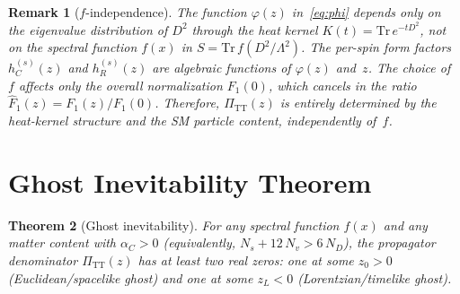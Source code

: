 \documentclass[11pt,a4paper]{article}
\newcommand{\PiTT}{\Pi_{\mathrm{TT}}}
\newcommand{\Fhat}{\hat{F}}
\newtheorem{theorem}{Theorem}
\newtheorem{remark}[theorem]{Remark}
\begin{document}
\begin{remark}[$f$-independence]
The function $\varphi(z)$ in~\eqref{eq:phi} depends only on the
eigenvalue distribution of $D^2$ through the heat kernel
$K(t) = \mathrm{Tr}\,e^{-tD^2}$, not on the spectral function
$f(x)$ in $S = \mathrm{Tr}\,f(D^2/\Lambda^2)$.
The per-spin form factors $h_C^{(s)}(z)$ and $h_R^{(s)}(z)$ are
algebraic functions of $\varphi(z)$ and~$z$.
The choice of $f$ affects only the overall normalization $F_1(0)$,
which cancels in the ratio $\Fhat_1(z) = F_1(z)/F_1(0)$.
Therefore, $\PiTT(z)$ is entirely determined by the heat-kernel
structure and the SM particle content, independently of~$f$.
\end{remark}


\section{Ghost Inevitability Theorem}

\begin{theorem}[Ghost inevitability]
\label{thm:main}
For any spectral function $f(x)$ and any matter content with
$\alpha_C > 0$ (equivalently, $N_s + 12\,N_v > 6\,N_D$),
the propagator denominator $\PiTT(z)$ has at least two real zeros:
one at some $z_0 > 0$ (Euclidean/spacelike ghost) and one at some
$z_L < 0$ (Lorentzian/timelike ghost).
\end{theorem}
\end{document}
